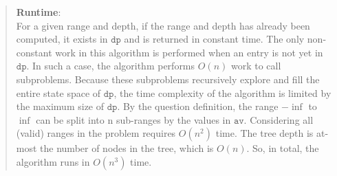 \documentclass[11pt]{article}
\newcommand{\code}[1]{$\texttt{#1}$}
\begin{document}
\begin{enumerate}
\begin{quote}
\medskip
\textbf{Runtime}: \\
For a given range and depth, if the range and depth has already been computed, it exists in \code{dp} and is returned in constant time. The only non-constant work in this algorithm is performed when an entry is not yet in \code{dp}. In such a case, the algorithm performs $O(n)$ work to call subproblems. Because these subproblems recursively explore and fill the entire state space of \code{dp}, the time complexity of the algorithm is limited by the maximum size of \code{dp}. By the question definition, the range $-\inf$ to $\inf$ can be split into n sub-ranges by the values in \code{av}. Considering all (valid) ranges in the problem requires $O(n^2)$ time. The tree depth is at-most the number of nodes in the tree, which is $O(n)$. So, in total, the algorithm runs in $O(n^3)$ time.
\end{quote}


\end{enumerate}
\end{document}
